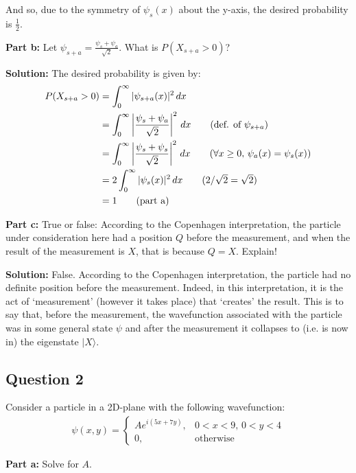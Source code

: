 \documentclass{article}
\begin{document}
And so, due to the symmetry of $\psi_s(x)$ about the y-axis, the desired probability is $\frac{1}{2}$.
\bigskip
\newpage

\noindent\textbf{Part b:} Let $\psi_{s+a}=\frac{\psi_s+\psi_a}{\sqrt{2}}$. What is $P(X_{s+a}>0)$?
\bigskip

\noindent\textbf{Solution:} The desired probability is given by:
\begin{align*}
    P(X_{s+a}>0)&=\int^{\infty}_0|\psi_{s+a}(x)|^2\,dx\\
    &=\int^{\infty}_0\left|\frac{\psi_s+\psi_a}{\sqrt{2}}\right|^2\,dx\tag{def. of $\psi_{s+a}$}\\
    &=\int^{\infty}_0\left|\frac{\psi_s+\psi_s}{\sqrt{2}}\right|^2\,dx\tag{$\forall x\ge0,\, \psi_a(x)=\psi_s(x)$}\\
    &=2\int^{\infty}_0|\psi_s(x)|^2\,dx\tag{$2/\sqrt{2}=\sqrt{2}$}\\
    &=1\tag{part a}
\end{align*}
\bigskip

\noindent\textbf{Part c:} True or false: According to the Copenhagen interpretation, the particle under consideration here had a position $Q$ before the measurement, and when the result of the measurement is $X$, that is because $Q=X$. Explain!
\bigskip

\noindent\textbf{Solution:} False. According to the Copenhagen interpretation, the particle had no definite position before the measurement. Indeed, in this interpretation, it is the act of `measurement' (however it takes place) that `creates' the result. This is to say that, before the measurement, the wavefunction associated with the particle was in some general state $\psi$ and after the measurement it collapses to (i.e. is now in) the eigenstate $|X\rangle$.
\bigskip
\newpage

\subsection*{Question 2}
Consider a particle in a 2D-plane with the following wavefunction:
\begin{align*}
    \psi(x,y)=\begin{cases}
        Ae^{i(5x+7y)},&0<x<9,\,0<y<4\\
        0,&\text{otherwise}
    \end{cases}
\end{align*}
\bigskip

\noindent\textbf{Part a:} Solve for $A$.
\bigskip
\end{document}
